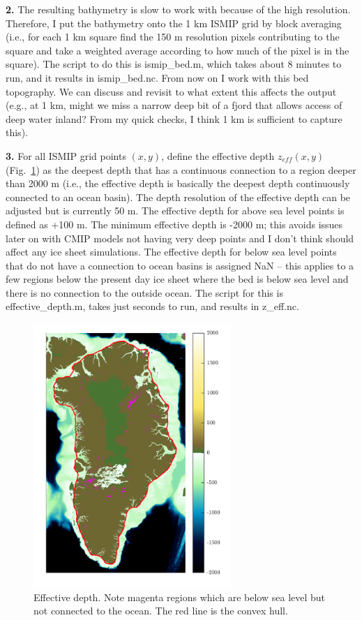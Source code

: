 \documentclass[11pt]{article}
\begin{document}
\textbf{2.} The resulting bathymetry is slow to work with because of the high resolution. Therefore, I put the bathymetry onto the 1 km ISMIP grid by block averaging (i.e., for each 1 km square find the 150 m resolution pixels contributing to the square and take a weighted average according to how much of the pixel is in the square). The script to do this is ismip\_bed.m, which takes about 8 minutes to run, and it results in ismip\_bed.nc. From now on I work with this bed topography. We can discuss and revisit to what extent this affects the output (e.g., at 1 km, might we miss a narrow deep bit of a fjord that allows access of deep water inland? From my quick checks, I think 1 km is sufficient to capture this).

\textbf{3.} For all ISMIP grid points $(x,y)$, define the effective depth $z_{eff}(x,y)$ (Fig.~\ref{eff_depth}) as the deepest depth that has a continuous connection to a region deeper than 2000 m (i.e., the effective depth is basically the deepest depth continuously connected to an ocean basin). The depth resolution of the effective depth can be adjusted but is currently 50 m. The effective depth for above sea level points is defined as +100 m. The minimum effective depth is -2000 m; this avoids issues later on with CMIP models not having very deep points and I don't think should affect any ice sheet simulations. The effective depth for below sea level points that do not have a connection to ocean basins is assigned NaN – this applies to a few regions below the present day ice sheet where the bed is below sea level and there is no connection to the outside ocean. The script for this is effective\_depth.m, takes just seconds to run, and results in z\_eff.nc.

\begin{figure}[h!]
\centering
\includegraphics[width=7.5cm]{effective_depth.png}
\caption{Effective depth. Note magenta regions which are below sea level but not connected to the ocean. The red line is the convex hull.}
\label{eff_depth}
\end{figure}
\end{document}
